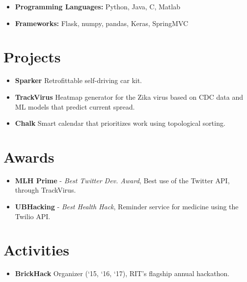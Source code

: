 \documentclass[11pt,a4paper,sans]{moderncv}        %
\begin{document}
\vspace{4pt}

\begin{itemize}

\item \textbf{Programming Languages:} Python, Java, C, Matlab
\item \textbf{Frameworks:} Flask, numpy, pandas, Keras, SpringMVC

\end{itemize}

\section{Projects}

\vspace{4pt}

\begin{itemize}

\item \textbf{Sparker} Retrofittable self-driving car kit.
\item \textbf{TrackVirus} Heatmap generator for the Zika virus based on CDC data and ML models that predict current spread.
\item \textbf{Chalk} Smart calendar that prioritizes work using topological sorting.

\end{itemize}

\section{Awards}

\vspace{4pt}

\begin{itemize}
    \item \textbf{MLH Prime} - \textit{Best Twitter Dev. Award}, Best use of the Twitter API, through TrackVirus.
    \item \textbf{UBHacking} - \textit{Best Health Hack}, Reminder service for medicine using the Twilio API.
\end{itemize}

\section{Activities}

\vspace{4pt}

\begin{itemize}

\item \textbf{BrickHack} Organizer (`15, `16, `17), RIT's flagship annual hackathon.

\end{itemize}
\end{document}
